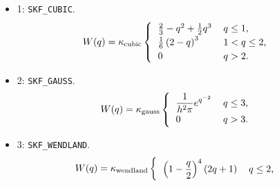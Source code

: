 \begin{itemize}
    \item 1: \verb|SKF_CUBIC|.
    \begin{equation}
        W(q) = \kappa_{\text{cubic}}
        \begin{cases}
          \begin{tabular}{l l}
              $\frac{2}{3} - q^{2} + \frac{1}{2} q^{3}$
              &
              $q \leq 1$, 
              
              \\
              
              $\frac{1}{6} \left(2 - q\right)^{3}$
              &
              $1 < q \leq 2$,
              \\
              
              0
              &
              $q > 2$.
          \end{tabular}  
        \end{cases} 
    \end{equation}

    \item 2: \verb|SKF_GAUSS|.
    \begin{equation}
        W(q) = \kappa_{\text{gauss}}
        \begin{cases}
          \begin{tabular}{l l}
              $\displaystyle{\frac{1}{h^{2}\pi}e^{q^{-2}}}$
              &
              $q \leq 3$, 
              
              \\
              
              0
              &
              $q > 3$.
          \end{tabular}  
        \end{cases} 
    \end{equation}

    \item 3: \verb|SKF_WENDLAND|.
    \begin{equation}
        W(q) = \kappa_{\text{wendland}}
        \begin{cases}
          \begin{tabular}{l l}
              $\displaystyle{\left(
              1 - \frac{q}{2}
              \right)^4
              (2q + 1)}$
              &
              $q \leq 2$, 
              
              \\
              

\end{tabular}
\end{cases}
\end{equation}
\end{itemize}
